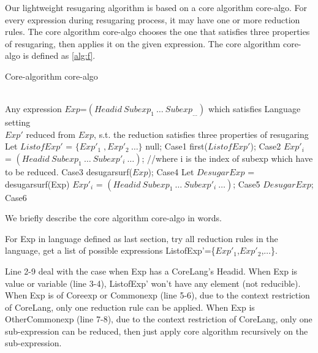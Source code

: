 Our lightweight resugaring algorithm is based on a core algorithm core-algo. For every expression during resugaring process, it may have one or more reduction rules. The core algorithm core-algo chooses the one that satisfies three properties of resugaring, then applies it on the given expression. The core algorithm core-algo is defined as \ref{alg:f}.
\begin{algorithm}
	\caption{Core-algorithm core-algo}
	\label{alg:f}     %
	\begin{algorithmic}[1]       %
		\REQUIRE ~~\\      %
		Any expression $Exp$=$(Headid~Subexp_{1}~\ldots~Subexp_{\ldots})$ which satisfies Language setting
		\ENSURE ~~\\     %
		$Exp'$ reduced from $Exp$, s.t. the reduction satisfies three properties of resugaring
		\STATE     Let $ListofExp'$ = $\{Exp'_{1}\;,Exp'_{2}~\ldots\}$
		\RETURN null; \hfill Case1
		\RETURN first($ListofExp'$); \hfill Case2
		\ELSE 
		\RETURN $Exp'_{i}$ = $(Headid~Subexp_{1}~\ldots~Subexp'_{i}~\ldots)$; //where i is the index of subexp which have to be reduced. \hfill Case3
		\ENDIF
		\ELSE 
		\RETURN desugarsurf($Exp$); \hfill Case4
		\ELSE
		\STATE Let $DesugarExp$ = desugarsurf(Exp)
		\RETURN $Exp'_{i}$ = $(Headid~Subexp_{1}~\ldots~Subexp'_{i}~\ldots)$; \hfill Case5
		\ELSE
		\RETURN $DesugarExp$; \hfill Case6
		\ENDIF
		\ENDIF
		\ENDIF
		
	\end{algorithmic}
\end{algorithm}

We briefly describe the core algorithm core-algo in words.

For Exp in language defined as last section, try all reduction rules in the language, get a list of possible expressions ListofExp'=\{$Exp'_{1}$,$Exp'_{2}$,$\ldots$\}. 

Line 2-9 deal with the case when Exp has a CoreLang's Headid. When Exp is value or variable (line 3-4), ListofExp' won't have any element (not reducible). When Exp is of Coreexp or Commonexp (line 5-6), due to the context restriction of CoreLang, only one reduction rule can be applied. When Exp is OtherCommonexp (line 7-8), due to the context restriction of CoreLang, only one sub-expression can be reduced, then just apply core algorithm recursively on the sub-expression.


